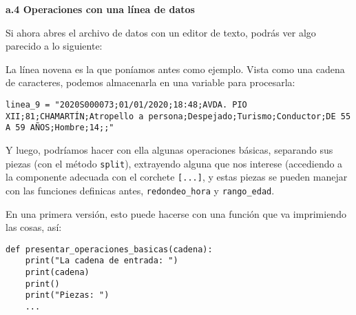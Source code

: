 \documentclass[11pt]{article}
\begin{document}
    \textbf{a.4 Operaciones con una línea de datos}

Si ahora abres el archivo de datos con un editor de texto, podrás ver
algo parecido a lo siguiente:

La línea novena es la que poníamos antes como ejemplo. Vista como una
cadena de caracteres, podemos almacenarla en una variable para
procesarla:

\begin{verbatim}
linea_9 = "2020S000073;01/01/2020;18:48;AVDA. PIO XII;81;CHAMARTÍN;Atropello a persona;Despejado;Turismo;Conductor;DE 55 A 59 AÑOS;Hombre;14;;"
\end{verbatim}

Y luego, podríamos hacer con ella algunas operaciones básicas, separando
sus piezas (con el método \texttt{split}), extrayendo alguna que nos
interese (accediendo a la componente adecuada con el corchete
\texttt{{[}...{]}}, y estas piezas se pueden manejar con las funciones
definicas antes, \texttt{redondeo\_hora} y \texttt{rango\_edad}.

En una primera versión, esto puede hacerse con una función que va
imprimiendo las cosas, así:

\begin{verbatim}
def presentar_operaciones_basicas(cadena):
    print("La cadena de entrada: ")
    print(cadena)
    print()
    print("Piezas: ")
    ...
\end{verbatim}
\end{document}
